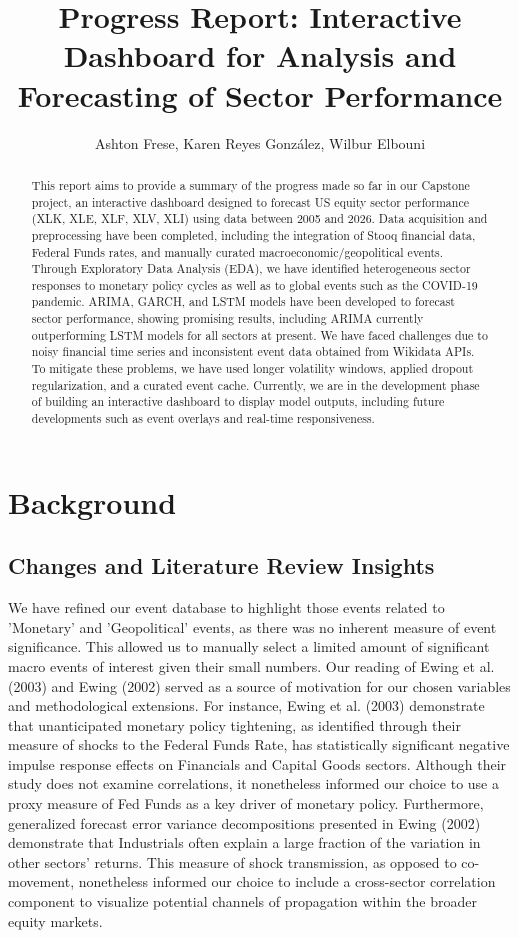\documentclass{article}
\title{\textbf{Progress Report: Interactive Dashboard for Analysis and Forecasting of Sector Performance}}
\author{Ashton Frese, Karen Reyes González, Wilbur Elbouni}
\begin{document}
\maketitle


\begin{abstract}
\noindent This report aims to provide a summary of the progress made so far in our Capstone project, an interactive dashboard designed to forecast US equity sector performance (XLK, XLE, XLF, XLV, XLI) using data between 2005 and 2026. Data acquisition and preprocessing have been completed, including the integration of Stooq financial data, Federal Funds rates, and manually curated macroeconomic/geopolitical events. Through Exploratory Data Analysis (EDA), we have identified heterogeneous sector responses to monetary policy cycles as well as to global events such as the COVID-19 pandemic. ARIMA, GARCH, and LSTM models have been developed to forecast sector performance, showing promising results, including ARIMA currently outperforming LSTM models for all sectors at present. We have faced challenges due to noisy financial time series and inconsistent event data obtained from Wikidata APIs. To mitigate these problems, we have used longer volatility windows, applied dropout regularization, and a curated event cache. Currently, we are in the development phase of building an interactive dashboard to display model outputs, including future developments such as event overlays and real-time responsiveness.
\end{abstract}

\section{Background}


\subsection{Changes and Literature Review Insights}
We have refined our event database to highlight those events related to 'Monetary' and 'Geopolitical' events, as there was no inherent measure of event significance. This allowed us to manually select a limited amount of significant macro events of interest given their small numbers.
Our reading of Ewing et al. (2003) and Ewing (2002) served as a source of motivation for our chosen variables and methodological extensions. For instance, Ewing et al. (2003) demonstrate that unanticipated monetary policy tightening, as identified through their measure of shocks to the Federal Funds Rate, has statistically significant negative impulse response effects on Financials and Capital Goods sectors. Although their study does not examine correlations, it nonetheless informed our choice to use a proxy measure of Fed Funds as a key driver of monetary policy. Furthermore, generalized forecast error variance decompositions presented in Ewing (2002) demonstrate that Industrials often explain a large fraction of the variation in other sectors' returns. This measure of shock transmission, as opposed to co-movement, nonetheless informed our choice to include a cross-sector correlation component to visualize potential channels of propagation within the broader equity markets.
\end{document}
